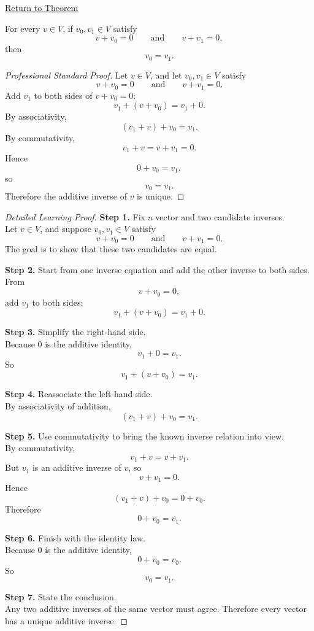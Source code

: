 
\newpage
{}
\label{prf:unique-additive-inverse}

\begin{remark*}[Return]
\hyperref[thm:unique-additive-inverse]{Return to Theorem}
\end{remark*}

\begin{theorem*}
For every $v \in V$, if $v_0,v_1 \in V$ satisfy
\[
v+v_0=0
\qquad\text{and}\qquad
v+v_1=0,
\]
then
\[
v_0=v_1.
\]
\end{theorem*}

\begin{proof}[Professional Standard Proof]
\LRAProofBodyStart
Let $v \in V$, and let $v_0,v_1 \in V$ satisfy
\[
v+v_0=0
\qquad\text{and}\qquad
v+v_1=0.
\]
Add $v_1$ to both sides of $v+v_0=0$:
\[
v_1+(v+v_0)=v_1+0.
\]
By associativity,
\[
(v_1+v)+v_0=v_1.
\]
By commutativity,
\[
v_1+v=v+v_1=0.
\]
Hence
\[
0+v_0=v_1,
\]
so
\[
v_0=v_1.
\]
Therefore the additive inverse of $v$ is unique.
\end{proof}

\begin{proof}[Detailed Learning Proof]
\LRAProofBodyStart

\textbf{Step 1.} Fix a vector and two candidate inverses.\\
Let $v \in V$, and suppose $v_0,v_1 \in V$ satisfy
\[
v+v_0=0
\qquad\text{and}\qquad
v+v_1=0.
\]
The goal is to show that these two candidates are equal.

\textbf{Step 2.} Start from one inverse equation and add the other inverse to both sides.\\
From
\[
v+v_0=0,
\]
add $v_1$ to both sides:
\[
v_1+(v+v_0)=v_1+0.
\]

\textbf{Step 3.} Simplify the right-hand side.\\
Because $0$ is the additive identity,
\[
v_1+0=v_1.
\]
So
\[
v_1+(v+v_0)=v_1.
\]

\textbf{Step 4.} Reassociate the left-hand side.\\
By associativity of addition,
\[
(v_1+v)+v_0=v_1.
\]

\textbf{Step 5.} Use commutativity to bring the known inverse relation into view.\\
By commutativity,
\[
v_1+v=v+v_1.
\]
But $v_1$ is an additive inverse of $v$, so
\[
v+v_1=0.
\]
Hence
\[
(v_1+v)+v_0=0+v_0.
\]
Therefore
\[
0+v_0=v_1.
\]

\textbf{Step 6.} Finish with the identity law.\\
Because $0$ is the additive identity,
\[
0+v_0=v_0.
\]
So
\[
v_0=v_1.
\]

\textbf{Step 7.} State the conclusion.\\
Any two additive inverses of the same vector must agree. Therefore every vector has a unique additive inverse.
\end{proof}


